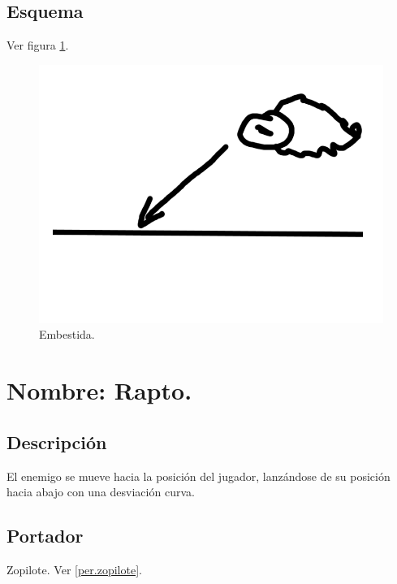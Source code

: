 		\subsection{Esquema}
		Ver figura \ref{fig:embestida}.
		\begin{figure}
			\centering
			\includegraphics[height=0.2 \textheight]{Imagenes/embestida}
			\caption{Embestida.}
			\label{fig:embestida}
		\end{figure}

	\section{Nombre: Rapto.} \label{hab.rapto}
		\subsection{Descripción}
		El enemigo se mueve hacia la posición del jugador, lanzándose de su posición hacia abajo con una desviación curva.
		\subsection{Portador}
		Zopilote. Ver \ref{per.zopilote}.
